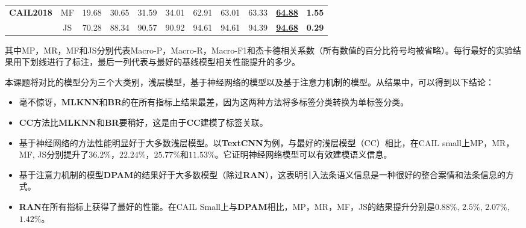 \begin{table}[htbp]
\begin{tabular}{@{}c|c|cccc|cc|c|c|c@{}}
        \textbf{CAIL2018}                 & MF                               & 19.68                    & 30.65                    & 31.59                   & 34.01                   & 62.91                                                     & 63.01                                                    & 63.33                                                                                      & \underline{\textbf{64.88}}                                                               & \textbf{1.55}                     \\
                                          & JS                                & 70.28                    & 88.34                    & 90.57                   & 90.92                   & 94.61                                                     & 94.61                                                    & 94.39                                                                                      & \underline{\textbf{94.68}}                                                                & \textbf{0.29}                     \\ \bottomrule
        \end{tabular}
\end{table}

其中MP，MR，MF和JS分别代表Macro-P，Macro-R，Macro-F1和杰卡德相关系数（所有数值的百分比符号均被省略）。每行最好的实验结果用下划线进行了标注，最后一列代表与最好的基线模型相关性能提升的多少。

本课题将对比的模型分为三个大类别，浅层模型，基于神经网络的模型以及基于注意力机制的模型。从结果中，可以得到以下结论：
\begin{itemize}
    \item 毫不惊讶，\textbf{MLKNN}和\textbf{BR}的在所有指标上结果最差，因为这两种方法将多标签分类转换为单标签分类。
    \item \textbf{CC}方法比\textbf{MLKNN}和\textbf{BR}要稍好，这是由于\textbf{CC}建模了标签关联。
    \item 基于神经网络的方法性能明显好于大多数浅层模型。以\textbf{TextCNN}为例，与最好的浅层模型（CC）相比，在CAIL small上MP，MR，MF, JS分别提升了$36.2\%$，$22.24\%$，$25.77\%$和$11.53\%$。它证明神经网络模型可以有效建模语义信息。
    \item 基于注意力机制的模型\textbf{DPAM}的结果好于大多数模型（除过\textbf{RAN}），这表明引入法条语义信息是一种很好的整合案情和法条信息的方式。
    \item \textbf{RAN}在所有指标上获得了最好的性能。在CAIL Small上与\textbf{DPAM}相比，MP，MR，MF，JS的结果提升分别是$0.88\%$, $2.5\%$, $2.07\%$, $1.42\%$。
\end{itemize}


